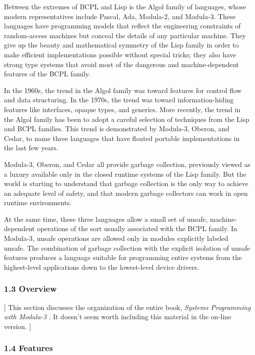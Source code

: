 \documentclass[10pt]{article}
\begin{document}
 Between the extremes of BCPL and Lisp is the Algol family of languages, whose modern representatives include Pascal, Ada, Modula-2, and Modula-3. These languages have programming models that reflect the engineering constraints of random-access machines but conceal the details of any particular machine. They give up the beauty and mathematical symmetry of the Lisp family in order to make efficient implementations possible without special tricks; they also have strong type systems that avoid most of the dangerous and machine-dependent features of the BCPL family. 


 In the 1960s, the trend in the Algol family was toward features for control flow and data structuring. In the 1970s, the trend was toward information-hiding features like interfaces, opaque types, and generics. More recently, the trend in the Algol family has been to adopt a careful selection of techniques from the Lisp and BCPL families. This trend is demonstrated by Modula-3, Oberon, and Cedar, to name three languages that have floated portable implementations in the last few years. 


  Modula-3, Oberon, and Cedar all provide garbage collection, previously viewed as a luxury available only in the closed runtime systems of the Lisp family. But the world is starting to understand that garbage collection is the only way to achieve an adequate level of safety, and that modern garbage collectors can work in open runtime environments. 


  At the same time, these three languages allow a small set of unsafe, machine-dependent operations of the sort usually associated with the BCPL family. In Modula-3, unsafe operations are allowed only in modules explicitly labeled unsafe. The combination of garbage collection with the explicit isolation of unsafe features produces a language suitable for programming entire systems from the highest-level applications down to the lowest-level device drivers. 


 
\subsubsection*{1.3 Overview}


  [ This section discusses the organization of the entire book, \emph{Systems Programming with Modula-3}
. It doesn't seem worth including this material in the on-line version. ] 
\subsubsection*{1.4 Features}
\end{document}
